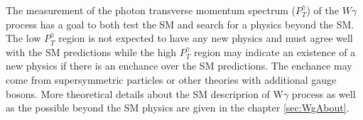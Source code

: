 The measurement of the photon transverse momentum spectrum ($P_T^{\gamma}$) of the $W\gamma$ process has a goal to both test the SM and search for a physics beyond the SM. The low $P_T^{\gamma}$ region is not expected to have any new physics and must agree well with the SM predictions while the high $P_T^{\gamma}$ region may indicate an existence of a new physics if there is an enchance over the SM predictions. The enchance may come from supersymmetric particles or other theories with additional gauge bosons. More theoretical details about the SM descriprion of W$\gamma$ process as well as the possible beyond the SM physics are given in the chapter \ref{sec:WgAbout}. \\   


